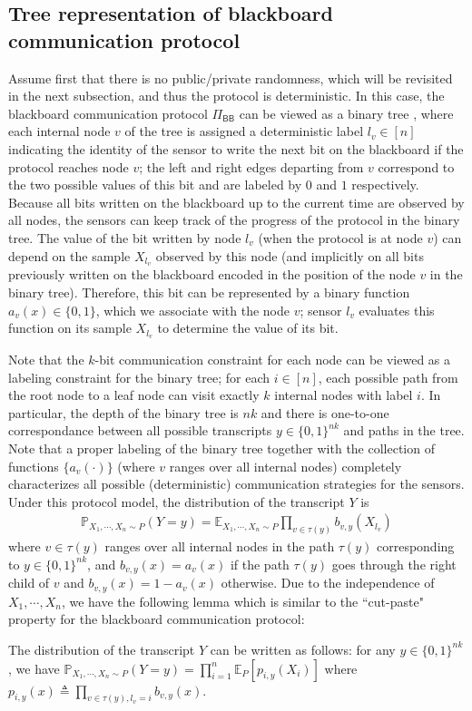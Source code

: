 \documentclass[final,12pt]{colt2018} %
\begin{document}
\subsection{Tree representation of blackboard communication protocol}
Assume first that there is no public/private randomness, which will be revisited in the next subsection, and thus the protocol is deterministic. In this case, the blackboard communication protocol $\Pi_{\mathsf{BB}}$ can be viewed as a binary tree \cite{kushilevitz1997communication}, where each internal node $v$ of the tree  is assigned a deterministic label $l_v\in [n]$ indicating the identity of the sensor to write the next bit on the blackboard if the protocol reaches node $v$; 
the left and right edges departing from $v$ correspond to the two possible values of this bit and are labeled by $0$ and $1$ respectively.
Because all bits written on the blackboard up to the current time are observed by all nodes, the sensors can keep track of the progress of the protocol in the binary tree. The value of the bit written by node $l_v$ (when the protocol is at node $v$) can depend on the sample $X_{l_v}$ observed by this node (and implicitly on all bits previously written on the blackboard encoded in  the position of the node $v$ in the binary tree). Therefore, this bit can be represented by a binary function $a_v(x)\in \{0,1\}$, which we associate with the node $v$; sensor $l_v$ evaluates this function on its sample $X_{l_v}$ to determine the value of its bit. 

Note that the $k$-bit communication constraint for each node can be viewed as a labeling constraint for the binary tree; for each $i\in [n]$, each possible path from the root node to a leaf node can visit exactly $k$ internal nodes with label $i$. In particular, the depth of the binary tree is $nk$ and there is one-to-one correspondance between all possible transcripts $y\in \{0,1\}^{nk}$ and paths in the tree. Note that a proper labeling of the binary tree together with the collection of functions $\{a_v(\cdot)\}$ (where $v$ ranges over all internal nodes)  completely characterizes all possible (deterministic) communication strategies for the sensors. Under this protocol model, the distribution of the transcript $Y$ is 
\begin{align*}
\mathbb{P}_{X_1,\cdots,X_n\sim P}(Y=y) = \mathbb{E}_{X_1,\cdots,X_n\sim P}\prod_{v\in \tau(y)} b_{v,y}(X_{l_v})
\end{align*}
where $v\in \tau(y)$ ranges over all internal nodes in the path $\tau(y)$ corresponding to $y\in \{0,1\}^{nk}$, and $b_{v,y}(x)=a_v(x)$ if the path $\tau(y)$ goes through the right child of $v$ and $b_{v,y}(x)=1-a_v(x)$ otherwise. Due to the independence of $X_1,\cdots,X_n$, we have the following lemma which is similar to the ``cut-paste" property \cite{bar2004information} for the blackboard communication protocol: 
\begin{lemma}\label{lemma.cut-paste}
	The distribution of the transcript $Y$ can be written as follows: for any $y\in \{0,1\}^{nk}$, we have
$
	\mathbb{P}_{X_1,\cdots,X_n\sim P}(Y=y) = \prod_{i=1}^n \mathbb{E}_{P}[p_{i,y}(X_i)]
$
	where $p_{i,y}(x)\triangleq \prod_{v\in \tau(y), l_v=i} b_{v,y}(x)$. 
\end{lemma}
\end{document}
